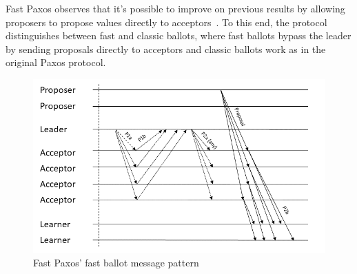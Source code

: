 Fast Paxos observes that it's possible to improve on previous results by allowing proposers to propose values directly to acceptors~\cite{Lamport2006}. To this end, the protocol distinguishes between fast and classic ballots, where fast ballots bypass the leader by sending proposals directly to acceptors and classic ballots work as in the original Paxos protocol. 
\begin{figure}
	\centering
	\includegraphics[width=\textwidth*2/3]{Figures/fast_paxos}
	\caption{Fast Paxos' fast ballot message pattern}
	\label{fast_paxos_fig}
\end{figure}
